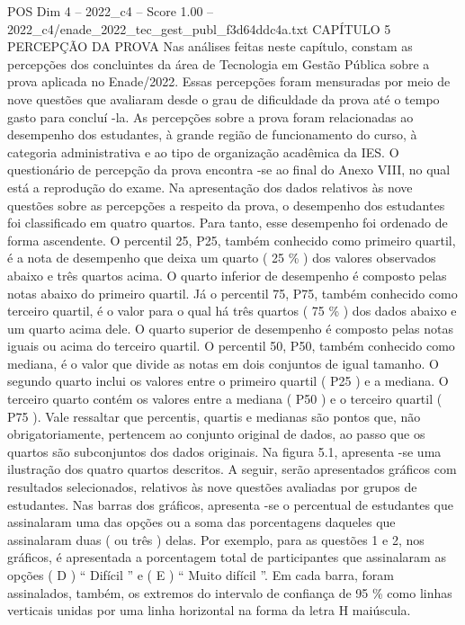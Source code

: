 \begin{textsample}{POS Dim 4 – 2022\_c4 – Score 1.00 – 2022\_c4/enade\_2022\_tec\_gest\_publ\_f3d64ddc4a.txt}  \label{ex:f4_pos_146}
CAPÍTULO 5 PERCEPÇÃO DA PROVA Nas análises feitas neste capítulo, constam as percepções dos concluintes da área de Tecnologia em Gestão Pública sobre a prova aplicada no Enade/2022.
Essas percepções foram mensuradas por meio de nove questões que avaliaram desde o grau de dificuldade da prova até o tempo gasto para concluí -la.
As percepções sobre a prova foram relacionadas ao desempenho dos estudantes, à grande região de funcionamento do curso, à categoria administrativa e ao tipo de organização acadêmica da IES.
O questionário de percepção da prova encontra -se ao final do Anexo VIII, no qual está a reprodução do exame.
Na apresentação dos dados relativos às nove questões sobre as percepções a respeito da prova, o desempenho dos estudantes foi classificado em quatro quartos.
Para tanto, esse desempenho foi ordenado de forma ascendente.
O percentil 25, P25, também conhecido como primeiro quartil, é a nota de desempenho que deixa um quarto ( 25 \% ) dos valores observados abaixo e três quartos acima.
O quarto inferior de desempenho é composto pelas notas abaixo do primeiro quartil.
Já o percentil 75, P75, também conhecido como terceiro quartil, é o valor para o qual há três quartos ( 75 \% ) dos dados abaixo e um quarto acima dele.
O quarto superior de desempenho é composto pelas notas iguais ou acima do terceiro quartil.
O percentil 50, P50, também conhecido como mediana, é o valor que divide as notas em dois conjuntos de igual tamanho.
O segundo quarto inclui os valores entre o primeiro quartil ( P25 ) e a mediana.
O terceiro quarto contém os valores entre a mediana ( P50 ) e o terceiro quartil ( P75 ).
Vale ressaltar que percentis, quartis e medianas são pontos que, não obrigatoriamente, pertencem ao conjunto original de dados, ao passo que os quartos são subconjuntos dos dados originais.
Na figura 5.1, apresenta -se uma ilustração dos quatro quartos descritos.
A seguir, serão apresentados gráficos com resultados selecionados, relativos às nove questões avaliadas por grupos de estudantes.
Nas barras dos gráficos, apresenta -se o percentual de estudantes que assinalaram uma das opções ou a soma das porcentagens daqueles que assinalaram duas ( ou três ) delas.
Por exemplo, para as questões 1 e 2, nos gráficos, é apresentada a porcentagem total de participantes que assinalaram as opções ( D ) “ Difícil ” e ( E ) “ Muito difícil ”.
Em cada barra, foram assinalados, também, os extremos do intervalo de confiança de 95 \% como linhas verticais unidas por uma linha horizontal na forma da letra H maiúscula.

\end{textsample}
